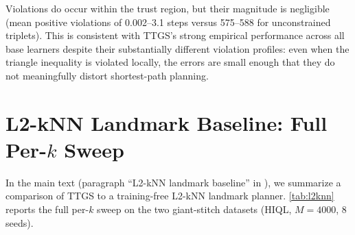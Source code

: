 \documentclass{article} %
\begin{document}
Violations do occur within the trust region, but their magnitude is negligible (mean positive violations of 0.002--3.1 steps versus 575--588 for unconstrained triplets). This is consistent with TTGS's strong empirical performance across all base learners despite their substantially different violation profiles: even when the triangle inequality is violated locally, the errors are small enough that they do not meaningfully distort shortest-path planning.

\section{L2-kNN Landmark Baseline: Full Per-$k$ Sweep} \label{apdx:l2knn}

In the main text (paragraph ``L2-kNN landmark baseline'' in ), we summarize a comparison of TTGS to a training-free L2-kNN landmark planner. \autoref{tab:l2knn} reports the full per-$k$ sweep on the two giant-stitch datasets (HIQL, $M{=}4000$, 8 seeds).
\end{document}
